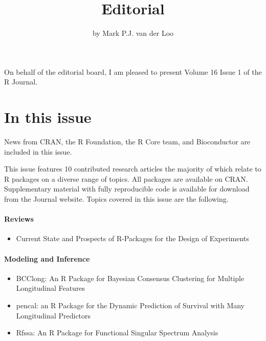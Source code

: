 \title{Editorial}


\author{by Mark P.J. van der Loo}

\maketitle


On behalf of the editorial board, I am pleased to present Volume 16 Issue 1 of
the R Journal.

\section*{In this issue}\label{in-this-issue}

News from CRAN, the R Foundation, the R Core team, and Bioconductor are included in this issue.

\noindent This issue features 10 contributed research articles the majority of
which relate to R packages on a diverse range of topics. All packages are
available on CRAN. Supplementary material with fully reproducible code is
available for download from the Journal website. Topics covered in this issue
are the following.

\paragraph{Reviews}\label{reviews}

\begin{itemize}
\tightlist
\item
  Current State and Prospects of R-Packages for the Design of Experiments
\end{itemize}

\paragraph{Modeling and Inference}\label{modeling-and-inference}

\begin{itemize}
\tightlist
\item
  BCClong: An R Package for Bayesian Consensus Clustering for Multiple Longitudinal Features
\item
  pencal: an R Package for the Dynamic Prediction of Survival with Many Longitudinal Predictors
\item
  Rfssa: An R Package for Functional Singular Spectrum Analysis
\end{itemize}

